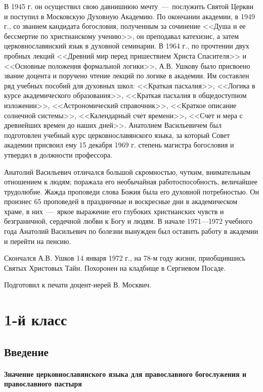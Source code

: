 \documentclass[11pt,a4paper,oneside]{memoir}
\begin{document}
    В 1945 г. он осуществил свою давнишнюю мечту~---~послужить Святой Церкви и поступил в Московскую Духовную Академию. По окончании академии, в 1949 г., со званием кандидата богословия, полученным за сочинение <<Душа и ее бессмертие по христианскому учению>>, он преподавал катехизис, а затем церковнославянский язык в духовной семинарии. В 1964 г., по прочтении двух пробных лекций <<Древний мир перед пришествием Христа Спасителя>> и <<Основные положения формальной логики>>, А.В. Ушкову было присвоено звание доцента и поручено чтение лекций по логике в академии. Им составлен ряд учебных пособий для духовных школ: <<Краткая пасхалия>>, <<Логика в курсе академического образования>>, <<Краткая пасхалия в общедоступном изложении>>, <<Астрономический справочник>>, <<Краткое описание солнечной системы>>, <<Календарный счет времени>>, <<Счет и мера с древнейших времен до наших дней>>. Анатолием Васильевичем был подготовлен учебный курс церковнославянского языка, за который Совет академии присвоил ему 15 декабря 1969 г. степень магистра богословия и утвердил в должности профессора.
    
    Анатолий Васильевич отличался большой скромностью, чутким, внимательным отношением к людям; поражала его необычайная работоспособность, величайшее трудолюбие. Жажда проповеди слова Божия была его духовной потребностью. Он произнес 65 проповедей в праздничные и воскресные дни в академическом храме, в них~---~яркое выражение его глубоких христианских чувств и безграничной, сердечной любви к Богу и людям. В начале 1971---1972 учебного года Анатолий Васильевич по болезни вынужден был оставить работу в академии и перейти на пенсию.
    
    Скончался А.В. Ушков 14 января 1972 г., на 78-м году жизни, приобщившись Святых Христовых Тайн. Похоронен на кладбище в Сергиевом Посаде.
    
    Подготовил к печати доцент-иерей В. Москвич.
    
    \chapter*{1-й класс}
    \label{ch:firstgrade}
        \section*{Введение}
        \label{sec:intro}
                \subsubsection[Значение церковнославянского языка]{Значение церковнославянского языка для православного богослужения и православного пастыря}
                
\end{document}
